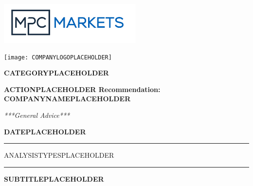 \documentclass[11pt,a4paper]{article}
\begin{document}
\begin{minipage}[t]{0.5\textwidth}
    \vspace{0pt}
    \raggedright
    \includegraphics[height=60pt, keepaspectratio]{mpc_logo.png}
\end{minipage}%
\begin{minipage}[t]{0.5\textwidth}
    \vspace{0pt}
    \raggedright
    \texttt{[image: COMPANYLOGOPLACEHOLDER]}
\end{minipage}

\vspace{2em}

\begin{center}
    {\Huge\bfseries\color{mpcblue} CATEGORYPLACEHOLDER}
\end{center}

\vspace{1.5em}

\begin{center}
    {\Huge\bfseries\color{mpcblue} ACTIONPLACEHOLDER Recommendation: COMPANYNAMEPLACEHOLDER}
    
    \vspace{1.2em}
    
    {\Large\itshape\color{gray} ***General Advice***}
    
    \vspace{1em}
    
    {\large\bfseries\color{mpcblue} DATEPLACEHOLDER}
\end{center}

\vspace{1.5em}
\noindent\rule{\textwidth}{0.5pt}
\vspace{1.5em}

\begin{adjustwidth}{0.33\textwidth}{0pt}
ANALYSISTYPESPLACEHOLDER
\end{adjustwidth}

\vspace{1em}
\noindent\rule{\textwidth}{0.5pt}
\vspace{1em}

\begin{center}
    {\Large\bfseries\color{mpcblue} SUBTITLEPLACEHOLDER}
\end{center}
\end{document}

